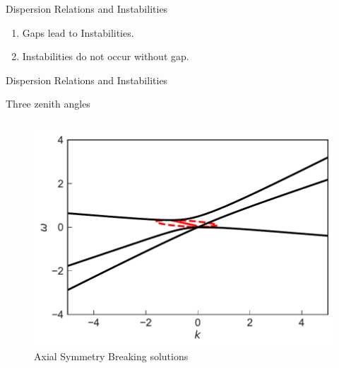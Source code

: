 \begin{frame}{Dispersion Relations and Instabilities}
\vspace{-0.8em}
\begin{enumerate}
   \item Gaps lead to Instabilities.
   \item Instabilities do not occur without gap.
\end{enumerate}

\end{frame}



\begin{frame}{Dispersion Relations and Instabilities}

\centering
      Three zenith angles

   \begin{columns}[T]

\begin{column}{0.5\textwidth}
   \begin{figure}
     \includegraphics[width=\linewidth]{assets/dr/spectDB3WC4DRDBMAAPltBlob.pdf}
     \caption*{Axial Symmetry Breaking solutions}
  \end{figure}
\end{column}


\end{columns}
\end{frame}
